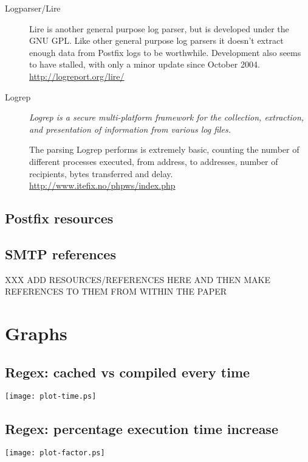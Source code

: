 \documentclass[a4paper,12pt,draft]{article}
\begin{document}
\begin{description}
    \item [Logparser/Lire] Lire is another general purpose log parser, but
        is developed under the GNU GPL\@.  Like other general purpose log
        parsers it doesn't extract enough data from Postfix logs to be
        worthwhile.  Development also seems to have stalled, with only a
        minor update since October 2004.  \newline
        \url{http://logreport.org/lire/}

    \item [Logrep] \textit{Logrep is a secure multi-platform framework for
        the collection, extraction, and presentation of information from
        various log files.\/}

        The parsing Logrep performs is extremely basic, counting the number
        of different processes executed, from address, to addresses, number
        of recipients, bytes transferred and delay.  \newline
        \url{http://www.itefix.no/phpws/index.php}

\end{description}

\subsection{Postfix resources}

\subsection{SMTP references}

XXX ADD RESOURCES/REFERENCES HERE AND THEN MAKE REFERENCES TO THEM FROM WITHIN THE PAPER





\section{Graphs}

\subsection{Regex: cached vs compiled every time}
\label{normal regex vs discard regex}
\texttt{[image: plot-time.ps]}


\subsection{Regex: percentage execution time increase}
\label{normal regex vs disarded regex factor}
\texttt{[image: plot-factor.ps]}
\end{document}
